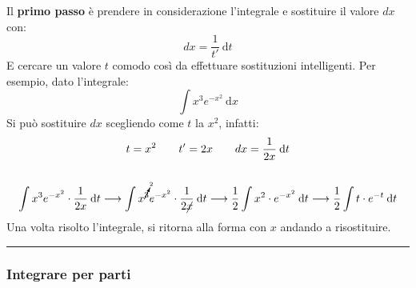 \documentclass[a4paper]{article}
\newcommand{\longline}{\noindent\rule{\textwidth}{0.4pt}}
\begin{document}
	\noindent
	Il \textbf{primo passo} è prendere in considerazione l'integrale e sostituire il valore $dx$ con:
	\begin{equation*}
		dx = \dfrac{1}{t'} \: \mathrm{d}t
	\end{equation*}
	E cercare un valore $t$ comodo così da effettuare sostituzioni intelligenti. Per esempio, dato l'integrale:
	\begin{equation*}
		\displaystyle\int x^{3}e^{-x^{2}} \: \mathrm{d}x
	\end{equation*}
	Si può sostituire $dx$ scegliendo come $t$ la $x^{2}$, infatti:
	\begin{gather*}
		t = x^{2} \hspace{2em} t' = 2x \hspace{2em} dx = \dfrac{1}{2x} \: \mathrm{d}t \\ \\
		\displaystyle\int x^{3}e^{-x^{2}} \cdot \dfrac{1}{2x} \: \mathrm{d}t
		\longrightarrow
		\displaystyle\int x^{\cancelto{2}{3}}e^{-x^{2}} \cdot \dfrac{1}{2\cancel{x}} \: \mathrm{d}t
		\longrightarrow
		\displaystyle\dfrac{1}{2}\int x^{2} \cdot e^{-x^{2}} \: \mathrm{d}t
		\longrightarrow
		\displaystyle\dfrac{1}{2}\int t \cdot e^{-t} \: \mathrm{d}t
	\end{gather*}
	Una volta risolto l'integrale, si ritorna alla forma con $x$ andando a risostituire.
	
	\longline

	\subsubsection{Integrare per parti}\label{subsubsection: integrare per parti}
\end{document}
